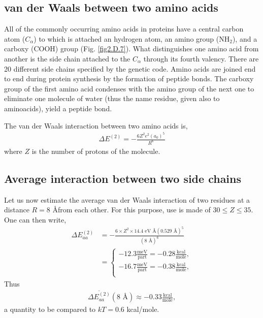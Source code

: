 \begin{subappendices}
 \subsection{van der Waals between two amino acids}
 All of the commonly occurring amino acids in proteins have a central carbon atom ($C_\alpha$) to which is attached an hydrogen atom, an amino group (NH$_2$), and a carboxy (COOH) group (Fig. \ref{fig2.D.7}). What distinguishes one amino acid from another is the side chain attached to the $C_\alpha$ through its fourth valency. There are 20 different side chains specified by the genetic code.
 Amino acids are joined end to end during protein synthesis by the formation of peptide bonds. The carboxy group of the first amino acid condenses with the amino group of the next one to eliminate one molecule of water (thus the name residue, given also to aminoacids),  yield a peptide bond.
 
 
 The van der Waals interaction between two amino acids is,
   \begin{align}\label{eq2.D.26}
\Delta E^{(2)}=-\frac{6Z^2e^2(a_0)^5}{R^6}
   \end{align} 
 where $Z$ is the number of protons of the molecule.
 \subsection{Average interaction between two side chains}
 Let us now estimate the average van der Waals interaction of two residues at a distance $R=8$ \AA from each other. For this purpose, use is made of $30\leq Z\leq 35$. One can then write,
   \begin{align}\label{eq2.D.27}
\nonumber \Delta E_{aa}^{(2)}&=-\frac{6\times Z^2\times 14.4\text{ eV \AA} (0.529\text{ \AA})^5}{(8\text{ \AA})^6}\\
&=\left\{\begin{array}{c}
 -12.3\frac{\text{meV}}{\text{part}}=-0.28\frac{\text{kcal}}{\text{mole}},\\
  -16.7\frac{\text{meV}}{\text{part}}=-0.38\frac{\text{kcal}}{\text{mole}},\\
\end{array}\right. 
   \end{align} 
 Thus
    \begin{align}\label{eq2.D.28}
\overline{\Delta E_{aa}^{(2)}}(8\text{ \AA})\approx-0.33\frac{\text{kcal}}{\text{mole}},
    \end{align} 
 a quantity to be compared to $kT=0.6$ kcal/mole.
 

\end{subappendices}
